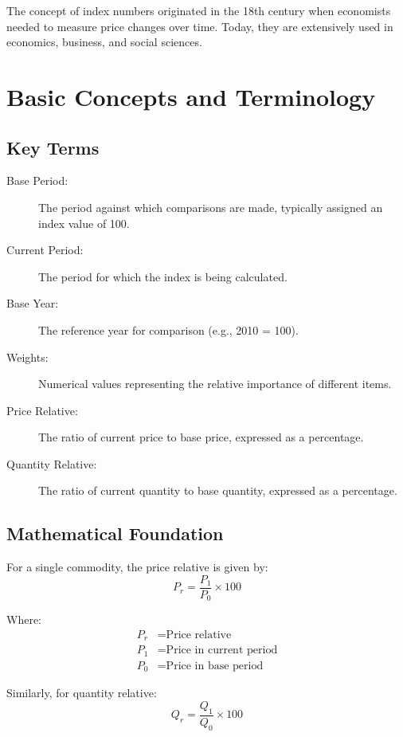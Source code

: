\documentclass[twoside]{book}
\begin{document}
The concept of index numbers originated in the 18th century when economists needed to measure price changes over time. Today, they are extensively used in economics, business, and social sciences.

\section{Basic Concepts and Terminology}

\subsection{Key Terms}

\begin{description}
    \item[Base Period:] The period against which comparisons are made, typically assigned an index value of 100.
    \item[Current Period:] The period for which the index is being calculated.
    \item[Base Year:] The reference year for comparison (e.g., 2010 = 100).
    \item[Weights:] Numerical values representing the relative importance of different items.
    \item[Price Relative:] The ratio of current price to base price, expressed as a percentage.
    \item[Quantity Relative:] The ratio of current quantity to base quantity, expressed as a percentage.
\end{description}

\subsection{Mathematical Foundation}

For a single commodity, the price relative is given by:
\begin{equation}
    P_r = \frac{P_1}{P_0} \times 100
\end{equation}

Where:
\begin{align}
    P_r &= \text{Price relative} \\
    P_1 &= \text{Price in current period} \\
    P_0 &= \text{Price in base period}
\end{align}

Similarly, for quantity relative:
\begin{equation}
    Q_r = \frac{Q_1}{Q_0} \times 100
\end{equation}
\end{document}
